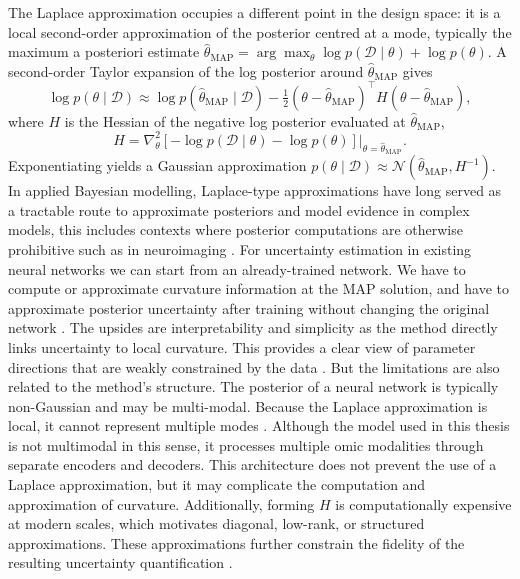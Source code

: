 The Laplace approximation occupies a different point in the design space: it is a local second-order approximation of the posterior centred at a mode, typically the maximum a posteriori estimate $\hat{\theta}_{\mathrm{MAP}} = \arg\max_\theta \log p(\mathcal{D}\mid\theta)+\log p(\theta)$. A second-order Taylor expansion of the log posterior around $\hat{\theta}_{\mathrm{MAP}}$ gives
\begin{equation}
\log p(\theta\mid\mathcal{D}) \approx 
\log p(\hat{\theta}_{\mathrm{MAP}}\mid\mathcal{D})
-\tfrac{1}{2}(\theta-\hat{\theta}_{\mathrm{MAP}})^\top H (\theta-\hat{\theta}_{\mathrm{MAP}}),
\end{equation}
where $H$ is the Hessian of the negative log posterior evaluated at $\hat{\theta}_{\mathrm{MAP}}$,
\begin{equation}
H = \nabla^2_\theta \left[-\log p(\mathcal{D}\mid\theta) - \log p(\theta)\right]\Big|_{\theta=\hat{\theta}_{\mathrm{MAP}}}.
\end{equation}
Exponentiating yields a Gaussian approximation $p(\theta\mid\mathcal{D})\approx \mathcal{N}(\hat{\theta}_{\mathrm{MAP}},H^{-1})$. In applied Bayesian modelling, Laplace-type approximations have long served as a tractable route to approximate posteriors and model evidence in complex models, this includes contexts where posterior computations are otherwise prohibitive such as in neuroimaging \cite{Friston2007laplace}. For uncertainty estimation in existing neural networks we can start from an already-trained network. We have to compute or approximate curvature information at the MAP solution, and have to approximate posterior uncertainty after training without changing the original network \cite{Friston2007laplace}. The upsides are interpretability and simplicity as the method directly links uncertainty to local curvature. This provides a clear view of parameter directions that are weakly constrained by the data \cite{Friston2007laplace}. But the limitations are also related to the method's structure. The posterior of a neural network is typically non-Gaussian and may be multi-modal. Because the Laplace approximation is local, it cannot represent multiple modes \cite{Friston2007laplace,Blei2018vi}. Although the model used in this thesis is not multimodal in this sense, it processes multiple omic modalities through separate encoders and decoders. This architecture does not prevent the use of a Laplace approximation, but it may complicate the computation and approximation of curvature. Additionally, forming $H$ is computationally expensive at modern scales, which motivates diagonal, low-rank, or structured approximations. These approximations further constrain the fidelity of the resulting uncertainty quantification \cite{Friston2007laplace}.

